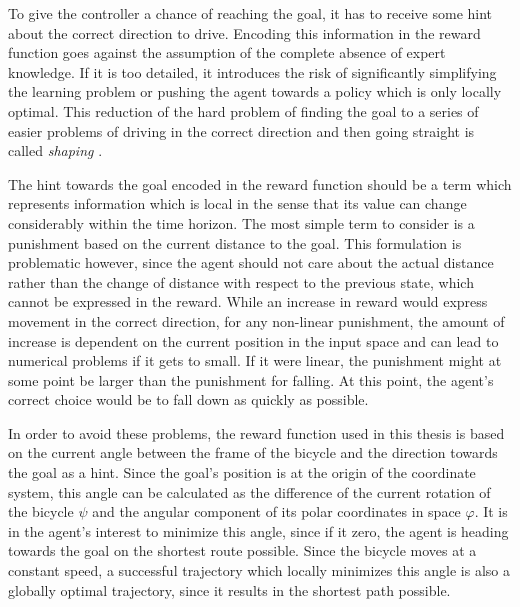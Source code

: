 To give the controller a chance of reaching the goal, it has to receive some hint about the correct direction to drive.
Encoding this information in the reward function goes against the assumption of the complete absence of expert knowledge.
If it is too detailed, it introduces the risk of significantly simplifying the learning problem or pushing the agent towards a policy which is only locally optimal.
This reduction of the hard problem of finding the goal to a series of easier problems of driving in the correct direction and then going straight is called \emph{shaping} \cite{sutton_reinforcement_1998,randlov_learning_1998}.

The hint towards the goal encoded in the reward function should be a term which represents information which is local in the sense that its value can change considerably within the time horizon.
The most simple term to consider is a punishment based on the current distance to the goal.
This formulation is problematic however, since the agent should not care about the actual distance rather than the change of distance with respect to the previous state, which cannot be expressed in the reward.
While an increase in reward would express movement in the correct direction, for any non-linear punishment, the amount of increase is dependent on the current position in the input space and can lead to numerical problems if it gets to small.
If it were linear, the punishment might at some point be larger than the punishment for falling.
At this point, the agent's correct choice would be to fall down as quickly as possible.

In order to avoid these problems, the reward function used in this thesis is based on the current angle between the frame of the bicycle and the direction towards the goal as a hint.
Since the goal's position is at the origin of the coordinate system, this angle can be calculated as the difference of the current rotation of the bicycle $\psi$ and the angular component of its polar coordinates in space $\varphi$.
It is in the agent's interest to minimize this angle, since if it zero, the agent is heading towards the goal on the shortest route possible.
Since the bicycle moves at a constant speed, a successful trajectory which locally minimizes this angle is also a globally optimal trajectory, since it results in the shortest path possible.

